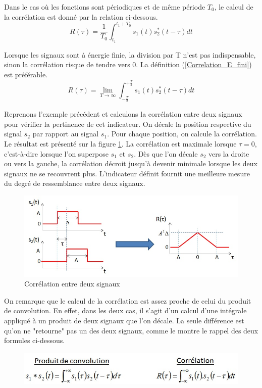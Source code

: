 	Dans le cas où les fonctions sont périodiques et de même période $T_{0}$, le calcul de la corrélation est donné par la relation ci-dessous.
	\begin{equation}\label{Prod_conv_periodique}
	R(\tau)=\frac{1}{T_{0}}\int_{t_{1}}^{t_{1}+T_{0}}s_{1}(t)s^{*}_{2}(t-\tau)dt
	\end{equation}
	
	Lorsque les signaux sont à énergie finie, la division par T n'est pas indispensable, sinon la corrélation risque de tendre vers 0. La définition (\ref{Correlation_E_fini}) est préférable.
	\begin{equation}\label{Correlation_E_fini}
	R(\tau)=\lim_{T \to \infty}\int_{-\frac{T}{2}}^{+\frac{T}{2}}s_{1}(t)s^{*}_{2}(t-\tau)dt
	\end{equation}
	 
	
	Reprenons l'exemple précédent et calculons la corrélation entre deux signaux pour vérifier la pertinence de cet indicateur. On décale la position respective du signal $s_{2}$ par rapport au signal $s_{1}$. Pour chaque position, on calcule la corrélation. Le résultat est présenté sur la figure \ref{Fig:ressemblance_via_convolution}. La corrélation est maximale lorsque $\tau = 0$, c'est-à-dire lorsque l'on superpose $s_{1}$ et $s_{2}$. Dès que l'on décale $s_{2}$ vers la droite ou vers la gauche, la corrélation décroit jusqu'à devenir minimale lorsque les deux signaux ne se recouvrent plus. L'indicateur définit fournit une meilleure mesure du degré de ressemblance entre deux signaux.  
	
	\begin{figure}[h!]
		\centering
		\includegraphics[scale=0.6]{images/ressemblance_via_convolution.jpg}
		\caption{Corrélation entre deux signaux}	
		\label{Fig:ressemblance_via_convolution} 
	\end{figure}

	On remarque que le calcul de la corrélation est assez proche de celui du produit de convolution. En effet, dans les deux cas, il s'agit d'un calcul d'une intégrale appliqué à un produit de deux signaux que l'on décale. La seule différence est qu'on ne "retourne" pas un des deux signaux, comme le montre le rappel des deux formules ci-dessous.
	\begin{figure}[h!]
		\centering
		\includegraphics[scale=0.6]{images/convo_vs_correlation.jpg} 
	\end{figure}
	
